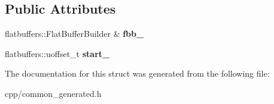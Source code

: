 \subsection*{Public Attributes}
\begin{DoxyCompactItemize}
\item 
\mbox{\label{structquantra_1_1YieldBuilder_ad24883d271247205317f29d52a8947f2}} 
flatbuffers\+::\+Flat\+Buffer\+Builder \& {\bfseries fbb\+\_\+}
\item 
\mbox{\label{structquantra_1_1YieldBuilder_aa50a4007525e91bcfd5a470675143a9a}} 
flatbuffers\+::uoffset\+\_\+t {\bfseries start\+\_\+}
\end{DoxyCompactItemize}


The documentation for this struct was generated from the following file\+:\begin{DoxyCompactItemize}
\item 
cpp/common\+\_\+generated.\+h\end{DoxyCompactItemize}
